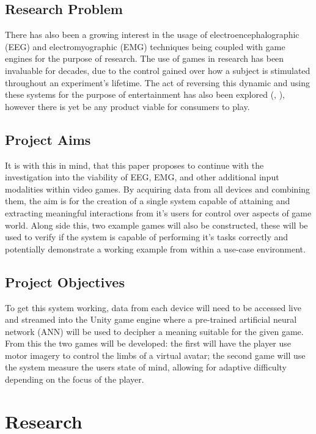 \documentclass[11pt, a4paper]{article}
\newcommand{\ccite}[1]{(\citeauthor{#1}, \citeyear{#1})}
\begin{document}
\subsection{Research Problem}
There has also been a growing interest in the usage of electroencephalographic (EEG) and electromyographic (EMG) techniques being coupled with game engines for the purpose of research. The use of games in research has been invaluable for decades, due to the control gained over how a subject is stimulated throughout an experiment's lifetime. The act of reversing this dynamic and using these systems for the purpose of entertainment has also been explored \ccite{6518141}, however there is yet be any product viable for consumers to play. 

\subsection{Project Aims}
It is with this in mind, that this paper proposes to continue with the investigation into the viability of EEG, EMG, and other additional input modalities within video games. By acquiring data from all devices and combining them, the aim is for the creation of a single system capable of attaining and extracting meaningful interactions from it's users for control over aspects of game world. Along side this, two example games will also be constructed, these will be used to verify if the system is capable of performing it's tasks correctly and potentially demonstrate a working example from within a use-case environment.

\subsection{Project Objectives}
To get this system working, data from each device will need to be accessed live and streamed into the Unity game engine where a pre-trained artificial neural network (ANN) will be used to decipher a meaning suitable for the given game. From this the two games will be developed: the first will have the player use motor imagery to control the limbs of a virtual avatar; the second game will use the system measure the users state of mind, allowing for adaptive difficulty depending on the focus of the player.

\pagebreak
\section{Research}	
\end{document}

